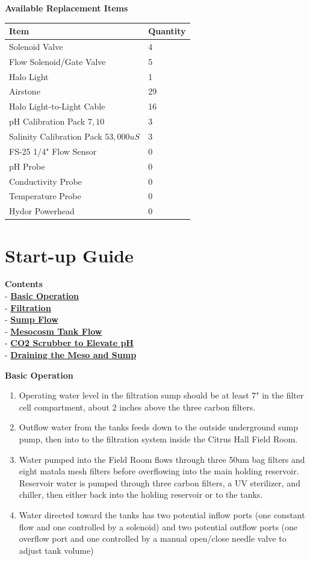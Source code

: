 \documentclass[]{book}
\providecommand{\tightlist}{%
  \setlength{\itemsep}{0pt}\setlength{\parskip}{0pt}}
\begin{document}
 \textbf{Available Replacement Items}

\begin{longtable}[]{@{}ll@{}}
\toprule
Item & Quantity\tabularnewline
\midrule
\endhead
Solenoid Valve & 4\tabularnewline
Flow Solenoid/Gate Valve & 5\tabularnewline
Halo Light & 1\tabularnewline
Airstone & 29\tabularnewline
Halo Light-to-Light Cable & 16\tabularnewline
pH Calibration Pack \(7,10\) & 3\tabularnewline
Salinity Calibration Pack \(53,000 uS\) & 3\tabularnewline
FS-25 1/4" Flow Sensor & 0\tabularnewline
pH Probe & 0\tabularnewline
Conductivity Probe & 0\tabularnewline
Temperature Probe & 0\tabularnewline
Hydor Powerhead & 0\tabularnewline
\bottomrule
\end{longtable}

\chapter{Start-up Guide}\label{start-up-guide}

\textbf{Contents}\\
- \protect\hyperlink{Basic_Operation}{\textbf{Basic Operation}}\\
- \protect\hyperlink{Filtration}{\textbf{Filtration}}\\
- \protect\hyperlink{Sump_Flow}{\textbf{Sump Flow}}\\
- \protect\hyperlink{Meso_Flow}{\textbf{Mesocosm Tank Flow}}\\
- \protect\hyperlink{CO2_Scrubber}{\textbf{CO2 Scrubber to Elevate
pH}}\\
- \protect\hyperlink{Draining_Sump}{\textbf{Draining the Meso and Sump}}

 \textbf{Basic Operation}

\begin{enumerate}
\def\labelenumi{\arabic{enumi}.}
\tightlist
\item
  Operating water level in the filtration sump should be at least 7" in
  the filter cell compartment, about 2 inches above the three carbon
  filters.
\item
  Outflow water from the tanks feeds down to the outside underground
  sump pump, then into to the filtration system inside the Citrus Hall
  Field Room.
\item
  Water pumped into the Field Room flows through three 50um bag filters
  and eight matala mesh filters before overflowing into the main holding
  reservoir. Reservoir water is pumped through three carbon filters, a
  UV sterilizer, and chiller, then either back into the holding
  reservoir or to the tanks.
\item
  Water directed toward the tanks has two potential inflow ports (one
  constant flow and one controlled by a solenoid) and two potential
  outflow ports (one overflow port and one controlled by a manual
  open/close needle valve to adjust tank volume)
\end{enumerate}
\end{document}
